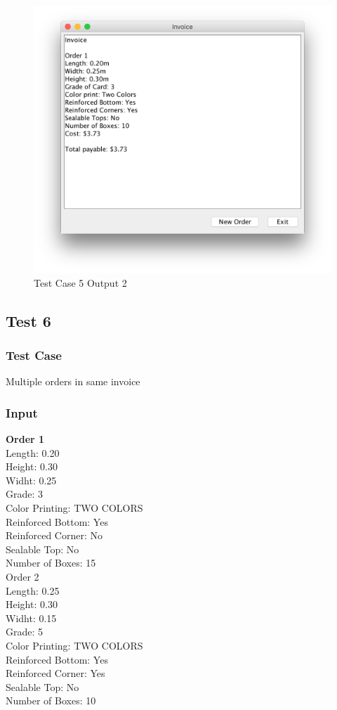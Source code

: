 \documentclass[12pt]{article}
\begin{document}
\begin{figure}[H]
	\includegraphics[width=\linewidth]{./screenshots/test_case_5_output_2.png}
	\caption{Test Case 5 Output 2}
	\label{test_case_5_output}
\end{figure}
\newpage
\subsection{Test 6}
\subsubsection{Test Case}
Multiple orders in same invoice
\subsubsection{Input}
\textbf{Order 1}\\
Length: 0.20\\
Height: 0.30\\
Widht: 0.25\\
Grade: 3\\
Color Printing: TWO COLORS\\
Reinforced Bottom: Yes\\
Reinforced Corner: No\\
Sealable Top: No\\
Number of Boxes: 15\\

Order 2\\
Length: 0.25\\
Height: 0.30\\
Widht: 0.15\\
Grade: 5\\
Color Printing: TWO COLORS\\
Reinforced Bottom: Yes\\
Reinforced Corner: Yes\\
Sealable Top: No\\
Number of Boxes: 10\\
\end{document}
